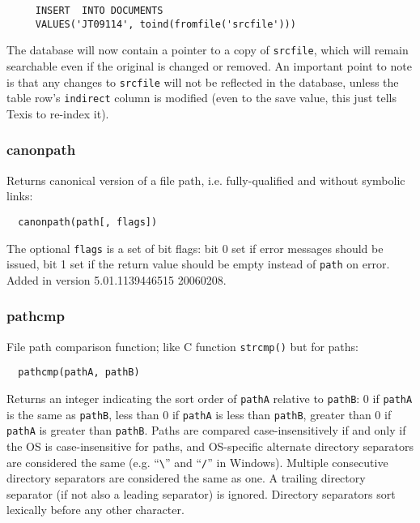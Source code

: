 \begin{verbatim}
     INSERT  INTO DOCUMENTS
     VALUES('JT09114', toind(fromfile('srcfile')))
\end{verbatim}

The database will now contain a pointer to a copy of \verb|srcfile|, which
will remain searchable even if the original is changed or removed.  An
important point to note is that any changes to \verb|srcfile| will not be
reflected in the database, unless the table row's \verb`indirect` column
is modified (even to the save value, this just tells Texis to re-index it).

\subsubsection{canonpath}

  Returns canonical version of a file path, i.e. fully-qualified and
without symbolic links:

\begin{verbatim}
  canonpath(path[, flags])
\end{verbatim}

The optional \verb`flags` is a set of bit flags: bit 0 set if error
messages should be issued, bit 1 set if the return value should be
empty instead of \verb`path` on error.  Added in version
5.01.1139446515 20060208.

\subsubsection{pathcmp}

  File path comparison function; like C function \verb`strcmp()` but
for paths:

\begin{verbatim}
  pathcmp(pathA, pathB)
\end{verbatim}

Returns an integer indicating the sort order of \verb`pathA` relative
to \verb`pathB`: 0 if \verb`pathA` is the same as \verb`pathB`, less
than 0 if \verb`pathA` is less than \verb`pathB`, greater than 0 if
\verb`pathA` is greater than \verb`pathB`.  Paths are compared
case-insensitively if and only if the OS is case-insensitive for
paths, and OS-specific alternate directory separators are considered
the same (e.g. ``\verb`\`'' and ``\verb`/`'' in Windows).  Multiple
consecutive directory separators are considered the same as one.  A
trailing directory separator (if not also a leading separator) is
ignored.  Directory separators sort lexically before any other
character.


